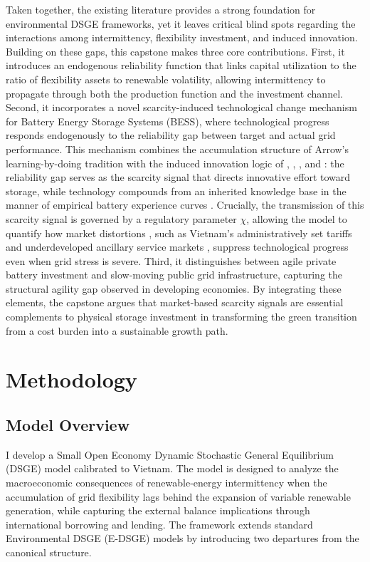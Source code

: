 \documentclass[12pt, a4paper]{article}
\begin{document}
	Taken together, the existing literature provides a strong foundation for environmental DSGE frameworks, yet it leaves critical blind spots regarding the interactions among intermittency, flexibility investment, and induced innovation. Building on these gaps, this capstone makes three core contributions. First, it introduces an endogenous reliability function that links capital utilization to the ratio of flexibility assets to renewable volatility, allowing intermittency to propagate through both the production function and the investment channel. Second, it incorporates a novel scarcity-induced technological change mechanism for Battery Energy Storage Systems (BESS), where technological progress responds endogenously to the reliability gap between target and actual grid performance. This mechanism combines the accumulation structure of Arrow's \citeyearpar{arrow1962} learning-by-doing tradition with the induced innovation logic of \citet{hicks1932}, \citet{kennedy1964}, \citet{drandakisphelps1966}, and \citet{acemoglu2002}: the reliability gap serves as the scarcity signal that directs innovative effort toward storage, while technology compounds from an inherited knowledge base in the manner of empirical battery experience curves \citep{kittner2017, way2022}. Crucially, the transmission of this scarcity signal is governed by a regulatory parameter $\chi$, allowing the model to quantify how market distortions ,  such as Vietnam's administratively set tariffs and underdeveloped ancillary service markets ,  suppress technological progress even when grid stress is severe. Third, it distinguishes between agile private battery investment and slow-moving public grid infrastructure, capturing the structural agility gap observed in developing economies. By integrating these elements, the capstone argues that market-based scarcity signals are essential complements to physical storage investment in transforming the green transition from a cost burden into a sustainable growth path.
	
	\section{Methodology} \label{sec:methodology}
	
	\subsection{Model Overview}
	
	I develop a Small Open Economy Dynamic Stochastic General Equilibrium (DSGE) model calibrated to Vietnam. The model is designed to analyze the macroeconomic consequences of renewable-energy intermittency when the accumulation of grid flexibility lags behind the expansion of variable renewable generation, while capturing the external balance implications through international borrowing and lending. The framework extends standard Environmental DSGE (E-DSGE) models by introducing two departures from the canonical structure.
	
\end{document}

